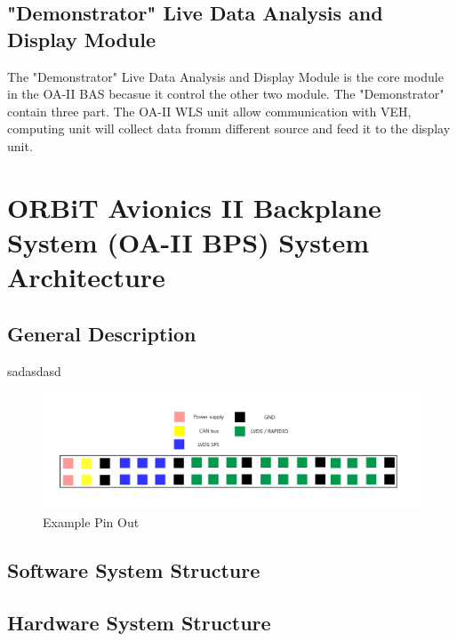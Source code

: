 \documentclass[12pt,article]{memoir}
\begin{document}
\section{"Demonstrator" Live Data Analysis and Display Module}
The "Demonstrator" Live Data Analysis and Display Module is the core module in the OA-II BAS becasue it control the other two module. The "Demonstrator" contain three part. The OA-II WLS unit allow communication with VEH, computing unit will collect data fromm different source and feed it to the display unit.
\chapter{ORBiT Avionics II Backplane System (OA-II BPS) System Architecture}
\section{General Description}
sadasdasd
\begin{figure}[h]
\includegraphics[width=\textwidth]{BPS_Pin.png}
 \caption{Example Pin Out}	
\end{figure}
\section{Software System Structure}
\section{Hardware System Structure}
\end{document}
